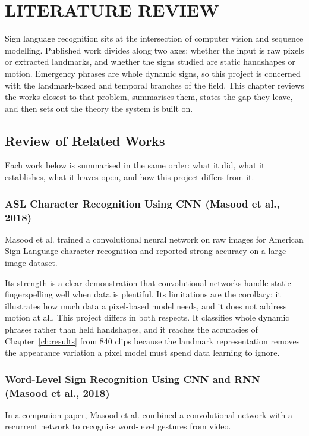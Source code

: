 \chapter{LITERATURE REVIEW}
\label{ch:litreview}

Sign language recognition sits at the intersection of computer vision and sequence modelling. Published work divides along two axes: whether the input is raw pixels or extracted landmarks, and whether the signs studied are static handshapes or motion. Emergency phrases are whole dynamic signs, so this project is concerned with the landmark-based and temporal branches of the field. This chapter reviews the works closest to that problem, summarises them, states the gap they leave, and then sets out the theory the system is built on.

\section{Review of Related Works}

Each work below is summarised in the same order: what it did, what it establishes, what it leaves open, and how this project differs from it.

\subsection{ASL Character Recognition Using CNN (Masood et al., 2018)}
Masood et al. \cite{masood2018aslchar} trained a convolutional neural network on raw images for American Sign Language character recognition and reported strong accuracy on a large image dataset.

Its strength is a clear demonstration that convolutional networks handle static fingerspelling well when data is plentiful. Its limitations are the corollary: it illustrates how much data a pixel-based model needs, and it does not address motion at all. This project differs in both respects. It classifies whole dynamic phrases rather than held handshapes, and it reaches the accuracies of Chapter~\ref{ch:results} from 840 clips because the landmark representation removes the appearance variation a pixel model must spend data learning to ignore.

\subsection{Word-Level Sign Recognition Using CNN and RNN (Masood et al., 2018)}
In a companion paper, Masood et al. \cite{masood2018slword} combined a convolutional network with a recurrent network to recognise word-level gestures from video.

